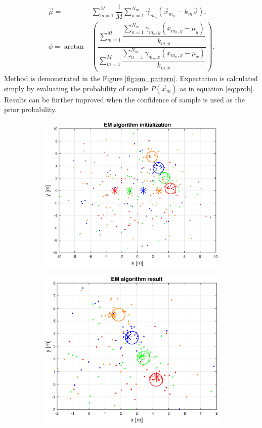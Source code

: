 \begin{align}
\vec{\mu} =& \sum_{m=1}^M \dfrac{1}{M}\sum_{n = 1}^{N_m}  \vec{\gamma}_{m_n} \left( \vec{x}_{m_n} - k_m \vec{v} \right) , \\
\phi = \arctan & \left( \dfrac{\sum_{m=1}^{M} \dfrac{\sum_{n = 1}^{N_m} \gamma_{m_n, y}(x_{m_n, y} - \mu_y)}{k_{m, y} } }{\sum_{m=1}^{M} \dfrac{\sum_{n = 1}^{N_m} \gamma_{m_n, x} (x_{m_n, x} - \mu_x) }{k_{m, x}} }\right).
\end{align}
Method is demonstrated in the Figure \ref{fig:em_pattern}. Expectation is calculated simply by evaluating the probability of sample $P(\vec{x}_m)$ as in equation \ref{eq:prob}. Results can be further improved when the confidence of sample is used as the prior probability.

\begin{figure}[H]
	\centering
	\begin{subfigure}{0.49\textwidth}
		\centering
		\includegraphics[scale=0.43]{fig/em_init.eps}
	\end{subfigure}
	\begin{subfigure}{.49\textwidth}
		\centering
		\includegraphics[scale=0.43]{fig/em_result.eps}


\end{subfigure}
\end{figure}
